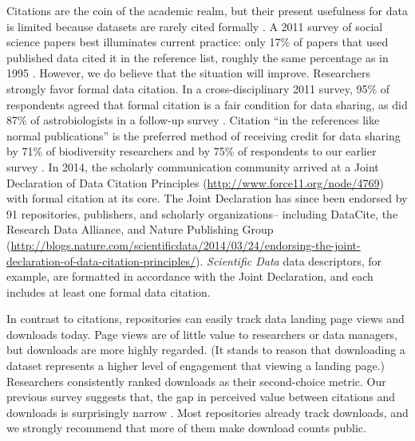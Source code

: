 \documentclass[english]{article}
\begin{document}

Citations are the coin of the academic realm, but their present usefulness for data is limited because datasets are rarely cited formally \cite{robinson-garcia_analyzing_2015}.
A 2011 survey of social science papers best illuminates current practice: only 17\% of papers that used published data cited it in the reference list, roughly the same percentage as in 1995 \cite{sieber_not_1995, mooney_citing_2011}. 
However, we do believe that the situation will improve. 
Researchers strongly favor formal data citation.
In a cross-disciplinary 2011 survey, 95\% of respondents agreed that formal citation is a fair condition for data sharing, as did 87\% of astrobiologists in a follow-up survey \cite{tenopir_data_2011, aydinoglu_data_2014}. 
Citation ``in the references like normal publications'' is the preferred method of receiving credit for data sharing by 71\% of biodiversity researchers and by 75\% of respondents to our earlier survey \cite{enke_users_2012, kratz_researcher_2015}.
In 2014, the scholarly communication community arrived at a Joint Declaration of Data Citation Principles (\url{http://www.force11.org/node/4769}) with formal citation at its core. 
The Joint Declaration has since been endorsed by 91 repositories, publishers, and scholarly organizations-- including DataCite, the Research Data Alliance, and Nature Publishing Group (\url{http://blogs.nature.com/scientificdata/2014/03/24/endorsing-the-joint-declaration-of-data-citation-principles/}).
\emph{Scientific Data} data descriptors, for example, are formatted in accordance with the Joint Declaration, and each includes at least one formal data citation.

In contrast to citations, repositories can easily track data landing page views and downloads today.
Page views are of little value to researchers or data managers, but downloads are more highly regarded.
(It stands to reason that downloading a dataset represents a higher level of engagement that viewing a landing page.)
Researchers consistently ranked downloads as their second-choice metric.
Our previous survey suggests that, the gap in perceived value between citations and downloads is surprisingly narrow \cite{kratz_researcher_2015}.
Most repositories already track downloads, and we strongly recommend that more of them make download counts public.
\end{document}
